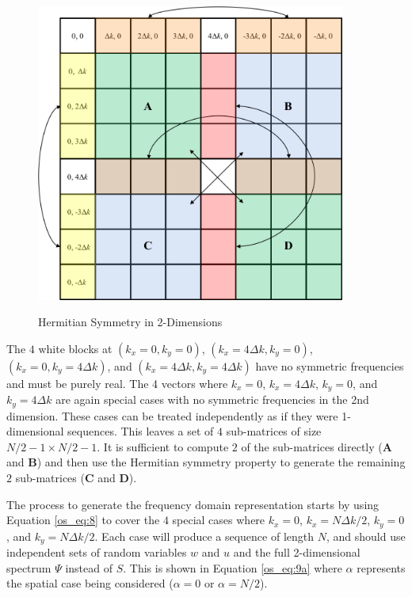 \begin{figure}[H]
  \begin{center}
\includegraphics[width=4in]{../media/Ocean_Surface/2-d_hermitian_symmetry.png}
  \end{center}
  \renewcommand{\baselinestretch}{1} \small\normalsize
  \begin{quote}
    \caption[Hermitian Symmetry in 2-Dimensions]{Hermitian Symmetry in 2-Dimensions \label{os_fig:7dd}}
  \end{quote}
\end{figure}
\renewcommand{\baselinestretch}{2} \small\normalsize

The $4$ white blocks at $(k_x=0, k_y=0)$, $(k_x=4\Delta k, k_y=0)$, $(k_x=0, k_y=4\Delta k)$, and $(k_x=4\Delta k, k_y=4\Delta k)$ have no symmetric frequencies and must be purely real. The 4 vectors where $k_x = 0$, $k_x = 4\Delta k$, $k_y = 0$, and $k_y = 4\Delta k$ are again special cases with no symmetric frequencies in the 2nd dimension. These cases can be treated independently as if they were 1-dimensional sequences. This leaves a set of $4$ sub-matrices of size $N/2 - 1 \times N/2 - 1$. It is sufficient to compute $2$ of the sub-matrices directly ($\mathbf{A}$ and $\mathbf{B}$) and then use the Hermitian symmetry property to generate the remaining $2$ sub-matrices ($\mathbf{C}$ and $\mathbf{D}$).

The process to generate the frequency domain representation starts by using Equation \ref{os_eq:8} to cover the $4$ special cases where $k_x = 0$, $k_x = N\Delta k/2$, $k_y = 0$, and $k_y = N\Delta k/2$. Each case will produce a sequence of length $N$, and should use independent sets of random variables $w$ and $u$ and the full 2-dimensional spectrum $\Psi$ instead of $S$. This is shown in Equation \ref{os_eq:9a} where $\alpha$ represents the spatial case being considered ($\alpha = 0$ or $\alpha = N/2$).

